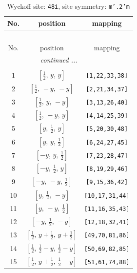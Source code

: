\documentclass[fleqn,8pt]{jsarticle}
\begin{document}
\begin{longtable}{ccc}
\caption{Wyckoff site: {\tt 48i}, site symmetry: {\tt m'.2'm}}
 \\
 \hline \hline
No. & position & mapping \\ \hline \endfirsthead

\multicolumn{2}{l}{\tablename\ \thetable{}} \\
 \hline \hline
No. & position & mapping \\ \hline \endhead

 \hline \hline
\multicolumn{2}{r}{\footnotesize\it continued ...} \\ \endfoot

 \hline \hline
\multicolumn{2}{r}{} \\ \endlastfoot

1 & $\left[ \frac{1}{2},\, y,\, y \right]$ & {\tt [1,22,33,38]} \\ \hline
2 & $\left[ \frac{1}{2},\, - y,\, - y \right]$ & {\tt [2,21,34,37]} \\ \hline
3 & $\left[ \frac{1}{2},\, y,\, - y \right]$ & {\tt [3,13,26,40]} \\ \hline
4 & $\left[ \frac{1}{2},\, - y,\, y \right]$ & {\tt [4,14,25,39]} \\ \hline
5 & $\left[ y,\, \frac{1}{2},\, y \right]$ & {\tt [5,20,30,48]} \\ \hline
6 & $\left[ y,\, y,\, \frac{1}{2} \right]$ & {\tt [6,24,27,45]} \\ \hline
7 & $\left[ - y,\, y,\, \frac{1}{2} \right]$ & {\tt [7,23,28,47]} \\ \hline
8 & $\left[ - y,\, \frac{1}{2},\, y \right]$ & {\tt [8,19,29,46]} \\ \hline
9 & $\left[ - y,\, - y,\, \frac{1}{2} \right]$ & {\tt [9,15,36,42]} \\ \hline
10 & $\left[ y,\, \frac{1}{2},\, - y \right]$ & {\tt [10,17,31,44]} \\ \hline
11 & $\left[ y,\, - y,\, \frac{1}{2} \right]$ & {\tt [11,16,35,43]} \\ \hline
12 & $\left[ - y,\, \frac{1}{2},\, - y \right]$ & {\tt [12,18,32,41]} \\ \hline
13 & $\left[ \frac{1}{2},\, y + \frac{1}{2},\, y + \frac{1}{2} \right]$ & {\tt [49,70,81,86]} \\ \hline
14 & $\left[ \frac{1}{2},\, \frac{1}{2} - y,\, \frac{1}{2} - y \right]$ & {\tt [50,69,82,85]} \\ \hline
15 & $\left[ \frac{1}{2},\, y + \frac{1}{2},\, \frac{1}{2} - y \right]$ & {\tt [51,61,74,88]} \\ \hline

\end{longtable}
\end{document}
